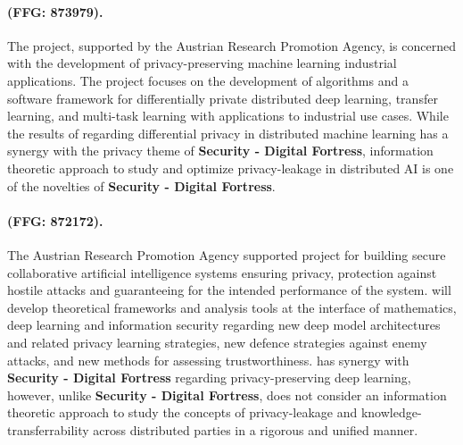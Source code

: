 \documentclass[a4paper,11pt]{article}
\newcommand{\project}[1]{\textbf{#1}\xspace}
\newcommand{\SECURITY}{\project{Security - Digital Fortress}}
\newcommand{\TheProject}{\SECURITY}
\begin{document}
\begin{mdframed}[backgroundcolor=blue!5]
\paragraph{\primal (FFG: 873979).}
The \primal project, supported by the Austrian Research Promotion Agency, is concerned with the development of privacy-preserving machine learning industrial applications. The project focuses on the development of algorithms and a software framework for differentially private distributed deep learning, transfer learning, and multi-task learning with applications to industrial use cases. While the results of \primal regarding differential privacy in distributed machine learning has a synergy with the privacy theme of \TheProject{}, information theoretic approach to study and optimize privacy-leakage in distributed AI is one of the novelties of \TheProject{}.
\end{mdframed}

\begin{mdframed}[backgroundcolor=blue!5]
\paragraph{\sthreeai (FFG: 872172).} The Austrian Research Promotion Agency supported \sthreeai project for building secure collaborative artificial intelligence systems ensuring privacy, protection against hostile attacks and guaranteeing for the intended performance of the system. \sthreeai will develop theoretical frameworks and analysis tools at the interface of mathematics, deep learning and information security regarding new deep model architectures and related privacy learning strategies, new defence strategies against enemy attacks, and new methods for assessing trustworthiness. \sthreeai has synergy with \TheProject{} regarding privacy-preserving deep learning, however, unlike \TheProject{}, \sthreeai does not consider an information theoretic approach to study the concepts of privacy-leakage and knowledge-transferrability across distributed parties in a rigorous and unified manner.    
\end{mdframed}
\end{document}
